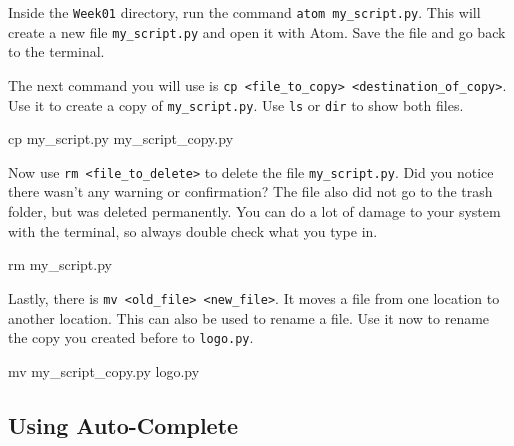 Inside the \texttt{Week01} directory, run the command \texttt{atom my\_script.py}. This will create a new file \texttt{my\_script.py} and open it with Atom. Save the file and go back to the terminal.

\vspace{1em}

\noindent The next command you will use is \texttt{cp <file\_to\_copy> <destination\_of\_copy>}. Use it to create a copy of \texttt{my\_script.py}. Use \texttt{ls} or \texttt{dir} to show both files.

\vspace{1em}

\begin{solution}
    \begin{outputcode}
cp my_script.py my_script_copy.py
    \end{outputcode}
\end{solution}

\noindent Now use \texttt{rm <file\_to\_delete>} to delete the file \texttt{my\_script.py}. Did you notice there wasn't any warning or confirmation? The file also did not go to the trash folder, but was deleted permanently. You can do a lot of damage to your system with the terminal, so always double check what you type in.

\vspace{1em}

\begin{solution}
    \begin{outputcode}
rm my_script.py
    \end{outputcode}
\end{solution}

\noindent Lastly, there is \texttt{mv <old\_file> <new\_file>}. It moves a file from one location to another location. This can also be used to rename a file. Use it now to rename the copy you created before to \texttt{logo.py}.

\vspace{1em}

\begin{solution}
    \begin{outputcode}
mv my_script_copy.py logo.py
    \end{outputcode}
\end{solution}

\subsection{Using Auto-Complete}

